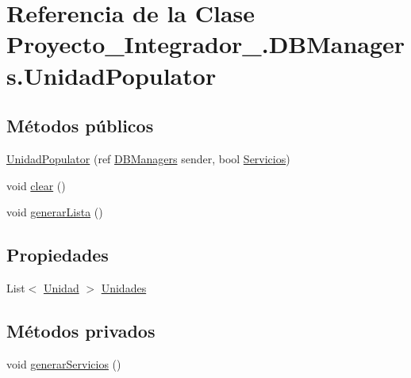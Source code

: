 \hypertarget{class_proyecto___integrador__3_1_1_d_b_managers_1_1_unidad_populator}{\section{Referencia de la Clase Proyecto\-\_\-\-Integrador\-\_.\-D\-B\-Managers.\-Unidad\-Populator}
\label{class_proyecto___integrador__3_1_1_d_b_managers_1_1_unidad_populator}
}


 


\subsection*{Métodos públicos}
\begin{DoxyCompactItemize}
\item 
\hyperlink{class_proyecto___integrador__3_1_1_d_b_managers_1_1_unidad_populator_ac1a734a096807ab39949757c2af7f933}{Unidad\-Populator} (ref \hyperlink{class_proyecto___integrador__3_1_1_d_b_managers}{D\-B\-Managers} sender, bool \hyperlink{class_proyecto___integrador__3_1_1_d_b_managers_1_1_unidad_populator_afe3e8b71dfc129ff61be9e8378403d60}{Servicios})
\item 
void \hyperlink{class_proyecto___integrador__3_1_1_d_b_managers_1_1_unidad_populator_ae0e720e8ddde06f35ac968e6f4b91152}{clear} ()
\item 
void \hyperlink{class_proyecto___integrador__3_1_1_d_b_managers_1_1_unidad_populator_aebe976375a6d64ebd4583fc545512902}{generar\-Lista} ()
\end{DoxyCompactItemize}
\subsection*{Propiedades}
\begin{DoxyCompactItemize}
\item 
List$<$ \hyperlink{class_proyecto___integrador__3_1_1_tipos_dato_1_1_unidad}{Unidad} $>$ \hyperlink{class_proyecto___integrador__3_1_1_d_b_managers_1_1_unidad_populator_afe040b3a09b399c74d58c04acbb0d30a}{Unidades}
\end{DoxyCompactItemize}
\subsection*{Métodos privados}
\begin{DoxyCompactItemize}
\item 
void \hyperlink{class_proyecto___integrador__3_1_1_d_b_managers_1_1_unidad_populator_a7bbd612c23164b5e52a6cc4931a05a56}{generar\-Servicios} ()
\end{DoxyCompactItemize}
